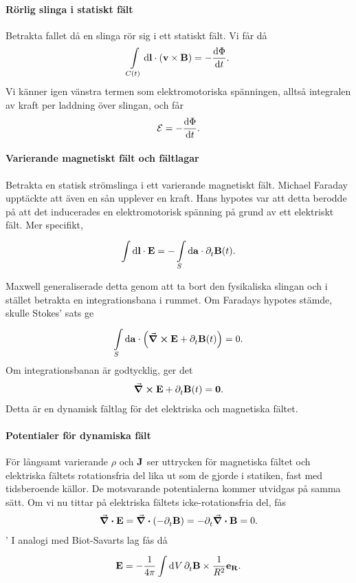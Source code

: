 \paragraph{Rörlig slinga i statiskt fält}
Betrakta fallet då en slinga rör sig i ett statiskt fält. Vi får då
\begin{align*}
	\int\limits_{C(t)}{\dd{\vb{l}}\cdot(\vb{v}\times\vb{B})} = -\dv{\Phi}{t}.
\end{align*}
Vi känner igen vänstra termen som elektromotoriska spänningen, alltså integralen av kraft per laddning över slingan, och får
\begin{align*}
	\mathcal{E} = -\dv{\Phi}{t}.
\end{align*}

\paragraph{Varierande magnetiskt fält och fältlagar}
Betrakta en statisk strömslinga i ett varierande magnetiskt fält. Michael Faraday upptäckte att även en sån upplever en kraft. Hans hypotes var att detta berodde på att det inducerades en elektromotorisk spänning på grund av ett elektriskt fält. Mer specifikt,
\begin{align*}
	\int\limits_{}^{}\dd{\vb{l}}\cdot \vb{E} = -\int\limits_{S}^{}\dd{\vb{a}}\cdot \partial_{t}^{}\vb{B}(t).
\end{align*}

Maxwell generaliserade detta genom att ta bort den fysikaliska slingan och i stället betrakta en integrationsbana i rummet. Om Faradays hypotes stämde, skulle Stokes' sats ge
\begin{align*}
	\int\limits_{S}^{}\dd{\vb{a}}\cdot \left(\curl{\vb{E}} + \partial_{t}^{}\vb{B}(t)\right) = 0.
\end{align*}
Om integrationsbanan är godtycklig, ger det
\begin{align*}
	\curl{\vb{E}} + \partial_{t}^{}\vb{B}(t) = \vb{0}.
\end{align*}
Detta är en dynamisk fältlag för det elektriska och magnetiska fältet.

\paragraph{Potentialer för dynamiska fält}
För långsamt varierande $\rho$ och $\vb{J}$ ser uttrycken för magnetiska fältet och elektriska fältets rotationsfria del lika ut som de gjorde i statiken, fast med tidsberoende källor. De motsvarande potentialerna kommer utvidgas på samma sätt. Om vi nu tittar på elektriska fältets icke-rotationsfria del, fås
\begin{align*}
	\div{\vb{E}} = \div(-\partial_{t}^{}\vb{B}) = -\partial_{t}^{}\div{\vb{B}} = 0.
\end{align*}'
I analogi med Biot-Savarts lag fås då
\begin{align*}
	\vb{E} = -\frac{1}{4\pi}\int\limits_{}^{}\dd[]{V}\partial_{t}^{}\vb{B}\times\frac{1}{R^{2}}\vb{e}_{\vb{R}}.
\end{align*}

